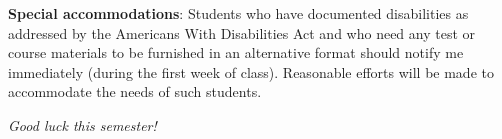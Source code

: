 \documentclass[12pt,twoside]{amsart}
\begin{document}
\textbf{Special accommodations}: Students who have documented disabilities as addressed by the Americans With Disabilities Act and who need any test or course materials to be furnished in an alternative format should notify me immediately (during the first week of class).  Reasonable efforts will be made to accommodate the needs of such students.


\begin{center}
\emph{ {\LARGE Good luck this semester!} }
\end{center}

\end{document}
